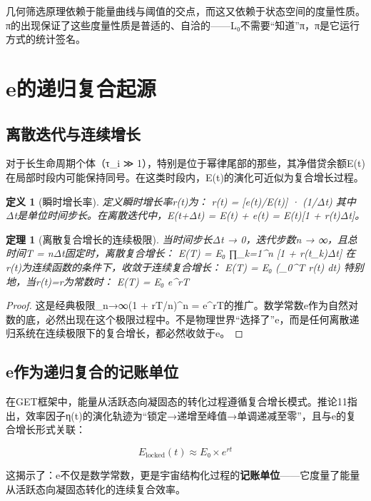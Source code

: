 \documentclass[12pt, a4paper]{article}
\newtheorem{theorem}{定理}[section]
\newtheorem{definition}{定义}[section]
\begin{document}
几何筛选原理\cite{liang2025}依赖于能量曲线与阈值的交点，而这又依赖于状态空间的度量性质。π的出现保证了这些度量性质是普适的、自洽的——L₀不需要“知道”π，π是它运行方式的统计签名。

\section{e的递归复合起源}

\subsection{离散迭代与连续增长}

对于长生命周期个体（τ_i ≫ 1），特别是位于幂律尾部的那些，其净借贷余额E(t)在局部时段内可能保持同号。在这类时段内，E(t)的演化可近似为复合增长过程。

\begin{definition}[瞬时增长率]
定义瞬时增长率r(t)为：
r(t) = [e(t)/E(t)] · (1/Δt)
其中Δt是单位时间步长。在离散迭代中，E(t+Δt) = E(t) + e(t) = E(t)[1 + r(t)Δt]。
\end{definition}

\begin{theorem}[离散复合增长的连续极限]
当时间步长Δt → 0，迭代步数n → ∞，且总时间T = nΔt固定时，离散复合增长：
E(T) = E₀ ∏_{k=1}^{n} [1 + r(t_k)Δt]
在r(t)为连续函数的条件下，收敛于连续复合增长：
E(T) = E₀ \exp\left(\int_0^T r(t) dt\right)
特别地，当r(t)=r为常数时：
E(T) = E₀ e^{rT}
\end{theorem}

\begin{proof}
这是经典极限\lim_{n→∞}(1 + rT/n)^n = e^{rT}的推广。数学常数e作为自然对数的底，必然出现在这个极限过程中。不是物理世界“选择了”e，而是任何离散递归系统在连续极限下的复合增长，都必然收敛于e。
\end{proof}

\subsection{e作为递归复合的记账单位}

在GET框架中，能量从活跃态向凝固态的转化过程遵循复合增长模式。推论11\cite{liang2025}指出，效率因子η(t)的演化轨迹为“锁定→递增至峰值→单调递减至零”，且与e的复合增长形式关联：

\[
E_{\text{locked}}(t) \approx E₀ × e^{rt}
\]

这揭示了：e不仅是数学常数，更是宇宙结构化过程的\textbf{记账单位}——它度量了能量从活跃态向凝固态转化的连续复合效率。
\end{document}
